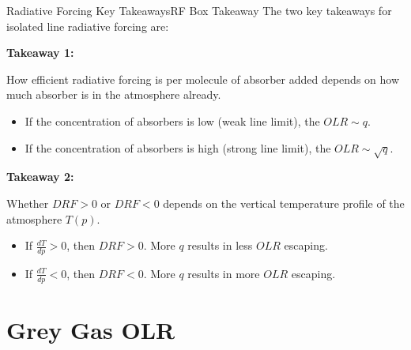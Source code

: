 \begin{fact}{Radiative Forcing Key Takeaways}{RF Box Takeaway}\label{RF Box Takeaway}
    The two key takeaways for isolated line radiative forcing are:

    \begin{minipage}{0.5\linewidth}
    \begin{tcolorbox}[colback=myyellow!50!white,colframe=mymagenta]
        \textbf{Takeaway 1:}

        How efficient radiative forcing is per molecule of absorber added depends on how much absorber is in the atmosphere already.

        \begin{itemize}
            \item If the concentration of absorbers is low (weak line limit), the $OLR\sim q$.
            \item If the concentration of absorbers is high (strong line limit), the $OLR\sim \sqrt{q}$.
        \end{itemize}
    \end{tcolorbox}
    \end{minipage}
    \hfill
    \begin{minipage}{0.45\linewidth}
    \begin{tcolorbox}[colback=myyellow!50!white,colframe=mymagenta]
        \textbf{Takeaway 2:}

        Whether $DRF>0$ or $DRF<0$ depends on the vertical temperature profile of the atmosphere $T(p)$. 

        \begin{itemize}
            \item If $\frac{dT}{dp}>0$, then $DRF>0$. More $q$ results in less $OLR$ escaping.
            \item If $\frac{dT}{dp}<0$, then $DRF<0$. More $q$ results in more $OLR$ escaping.
        \end{itemize}
        
    \end{tcolorbox}
    \end{minipage}
\end{fact}

\section{Grey Gas OLR}

